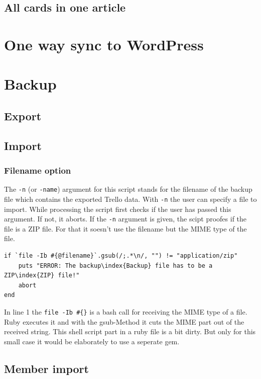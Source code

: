 \subsection{All cards in one article}

\section{One way sync to WordPress}

\section{Backup}

\subsection{Export}

\subsection{Import}

\subsubsection{Filename option}
The \texttt{-n} (or \texttt{-name}) argument for this script stands for the filename of the backup file which contains the  exported Trello data. With \texttt{-n} the user can specify a file to import. While processing the script first checks if the user has passed this argument. If not, it aborts. If the \texttt{-n} argument is given, the scipt proofes if the file is a ZIP file. For that it soesn't use the filename but the MIME type of the file.

\begin{lstlisting}[float=htb, caption=Checking if the file has the MIME type \textquotedblleft application/zip\textquotedblright, label=listing008]
if `file -Ib #{@filename}`.gsub(/;.*\n/, "") != "application/zip"
	puts "ERROR: The backup\index{Backup} file has to be a ZIP\index{ZIP} file!"
	abort
end
\end{lstlisting}

	
In line 1 the \texttt{file -Ib \#\{\@filename\}} is a bash call for receiving the MIME type of a file. Ruby executes it and with the gsub-Method it cuts the MIME part out of the received string. This shell script part in a ruby file is a bit dirty. But only for this small case it would be elaborately to use a seperate gem.


\subsection{Member import}

